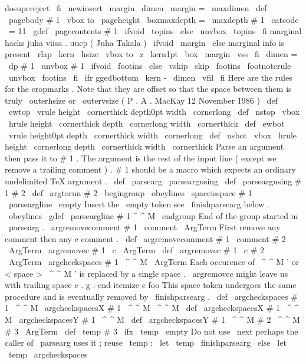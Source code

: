 {{dosupereject
\
fi
}
\
newinsert
\
margin
\
dimen
\
margin
=
\
maxdimen
\
def
\
pagebody
#
1
{
\
vbox
to
\
pageheight
{
\
boxmaxdepth
=
\
maxdepth
#
1
}
}
{
\
catcode
\
=
11
\
gdef
\
pagecontents
#
1
{
\
ifvoid
\
topins
\
else
\
unvbox
\
topins
\
fi
%
marginal
hacks
juha
viisa
.
uucp
(
Juha
Takala
)
\
ifvoid
\
margin
\
else
%
marginal
info
is
present
\
rlap
{
\
kern
\
hsize
\
vbox
to
\
z
{
\
kern1pt
\
box
\
margin
\
vss
}
}
\
fi
\
dimen
=
\
dp
#
1
\
unvbox
#
1
\
ifvoid
\
footins
\
else
\
vskip
\
skip
\
footins
\
footnoterule
\
unvbox
\
footins
\
fi
\
ifr
ggedbottom
\
kern
-
\
dimen
\
vfil
\
fi
}
}
%
Here
are
the
rules
for
the
cropmarks
.
Note
that
they
are
%
offset
so
that
the
space
between
them
is
truly
\
outerhsize
or
\
outervsize
%
(
P
.
A
.
MacKay
12
November
1986
)
%
\
def
\
ewtop
{
\
vrule
height
\
cornerthick
depth0pt
width
\
cornerlong
}
\
def
\
nstop
{
\
vbox
{
\
hrule
height
\
cornerthick
depth
\
cornerlong
width
\
cornerthick
}
}
\
def
\
ewbot
{
\
vrule
height0pt
depth
\
cornerthick
width
\
cornerlong
}
\
def
\
nsbot
{
\
vbox
{
\
hrule
height
\
cornerlong
depth
\
cornerthick
width
\
cornerthick
}
}
%
Parse
an
argument
then
pass
it
to
#
1
.
The
argument
is
the
rest
of
%
the
input
line
(
except
we
remove
a
trailing
comment
)
.
#
1
should
be
a
%
macro
which
expects
an
ordinary
undelimited
TeX
argument
.
%
\
def
\
parsearg
{
\
parseargusing
{
}
}
\
def
\
parseargusing
#
1
#
2
{
%
\
def
\
argtorun
{
#
2
}
%
\
begingroup
\
obeylines
\
spaceisspace
#
1
%
\
parseargline
\
empty
%
Insert
the
\
empty
token
see
\
finishparsearg
below
.
}
{
\
obeylines
%
\
gdef
\
parseargline
#
1
^
^
M
{
%
\
endgroup
%
End
of
the
group
started
in
\
parsearg
.
\
argremovecomment
#
1
\
comment
\
ArgTerm
%
}
%
}
%
First
remove
any
comment
then
any
c
comment
.
\
def
\
argremovecomment
#
1
\
comment
#
2
\
ArgTerm
{
\
argremovec
#
1
\
c
\
ArgTerm
}
\
def
\
argremovec
#
1
\
c
#
2
\
ArgTerm
{
\
argcheckspaces
#
1
\
^
^
M
\
ArgTerm
}
%
Each
occurence
of
\
^
^
M
'
or
<
space
>
\
^
^
M
'
is
replaced
by
a
single
space
.
%
%
\
argremovec
might
leave
us
with
trailing
space
e
.
g
.
%
end
itemize
c
foo
%
This
space
token
undergoes
the
same
procedure
and
is
eventually
removed
%
by
\
finishparsearg
.
%
\
def
\
argcheckspaces
#
1
\
^
^
M
{
\
argcheckspacesX
#
1
\
^
^
M
\
^
^
M
}
\
def
\
argcheckspacesX
#
1
\
^
^
M
{
\
argcheckspacesY
#
1
\
^
^
M
}
\
def
\
argcheckspacesY
#
1
\
^
^
M
#
2
\
^
^
M
#
3
\
ArgTerm
{
%
\
def
\
temp
{
#
3
}
%
\
ifx
\
temp
\
empty
%
Do
not
use
\
next
perhaps
the
caller
of
\
parsearg
uses
it
;
reuse
\
temp
:
\
let
\
temp
\
finishparsearg
\
else
\
let
\
temp
\
argcheckspaces
}}
